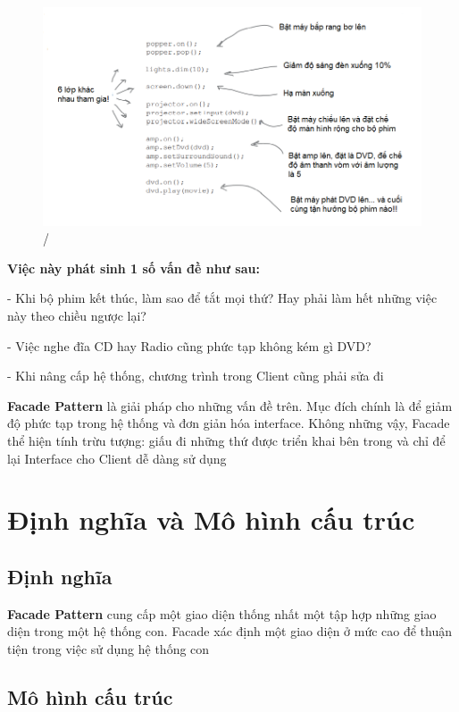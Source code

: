 \begin{figure}[!htb]
    \centering
    \includegraphics[width=\textwidth]{fig/Facade/TheaterWithClassMethodCalling.png}/
\end{figure}
\textbf{Việc này phát sinh 1 số vấn đề như sau:}\smallskip

- Khi bộ phim kết thúc, làm sao để tắt mọi thứ? Hay phải làm hết những việc này theo chiều ngược lại?\smallskip

- Việc nghe đĩa CD hay Radio cũng phức tạp không kém gì DVD?\smallskip

- Khi nâng cấp hệ thống, chương trình trong Client cũng phải sửa đi\bigskip

\textbf{Facade Pattern} là giải pháp cho những vấn đề trên. Mục đích chính là để giảm độ phức tạp trong hệ thống và đơn giản hóa interface. Không những vậy, Facade thể hiện tính trừu tượng: giấu đi những thứ được triển khai bên trong và chỉ để lại Interface cho Client dễ dàng sử dụng
\newpage
\section{Định nghĩa và Mô hình cấu trúc}
\subsection{Định nghĩa}

\textbf{Facade Pattern} cung cấp một giao diện thống nhất một tập hợp những giao diện trong một hệ thống con. Facade xác định một giao diện ở mức cao để thuận tiện trong việc sử dụng hệ thống con

\subsection{Mô hình cấu trúc}

